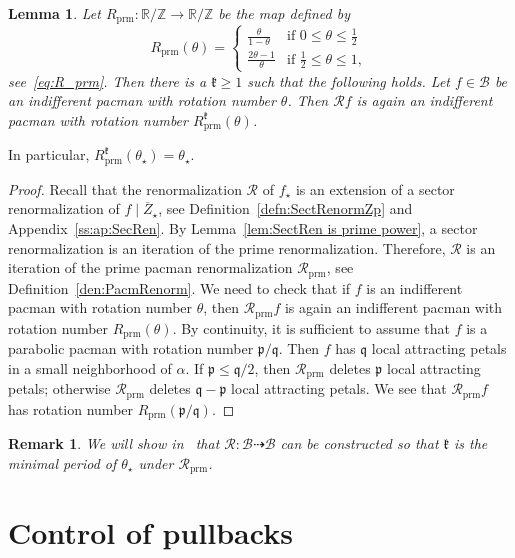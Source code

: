 \documentclass[]{amsart}
\newcommand\RR{\mathcal{R}}
\newcommand\prm{{\operatorname{prm}}}
\newcommand\RRc{\mathcal{R}_{\prm}}
\newcommand\cRRc{R_{\prm}}%
\newcommand{\str}{{\star}}
\newcommand{\pp}{\mathfrak{p}}
\renewcommand{\qq}{\mathfrak{q}}
\newcommand{\kk}{\mathfrak{k}}
\newcommand\BB{\mathcal{B}}
\newcommand{\R}{\mathbb{R}}
\newcommand{\Z}{\mathbb{Z}}
\newtheorem{lem}[thm]{Lemma}
\newtheorem{rem}[thm]{Remark}
\theoremstyle{remark}
\numberwithin{equation}{section}
\theoremstyle{definition}
\begin{document}
\begin{lem}
\label{lem:eq:S3:R_prm}
Let $\cRRc\colon \R/\Z\to \R/\Z$ be the map defined by
\begin{equation}
\label{eq:S3:R_prm}
 \cRRc (\theta)  = \begin{cases} \frac{\theta}{1-\theta}& \mbox{if }0\le \theta \le \frac{1}{2} \\
\frac{2\theta-1}{\theta} & \mbox{if }\frac{1}{2}\le \theta\le 1, \end{cases}
\end{equation} see~\eqref{eq:R_prm}. Then there is a $\kk\ge 1$ such that the following holds. Let $f\in \BB$ be an indifferent pacman with rotation number $\theta$. Then $\RR f$ is again an indifferent pacman with rotation number $\cRRc^\kk (\theta)$. 
\end{lem}
\noindent In particular, $\cRRc^\kk (\theta_\str)=\theta_\str$.
\begin{proof}
Recall that the renormalization $\RR$ of $ f_\str$ is an extension of a sector renormalization of $f\mid \overline Z_\str$, see Definition~\ref{defn:SectRenormZp} and Appendix~\ref{ss:ap:SecRen}. By Lemma~\ref{lem:SectRen is prime power}, a sector renormalization is an iteration of the prime renormalization. Therefore, $\RR$ is an iteration of the prime pacman renormalization $\RRc$, see Definition~\ref{den:PacmRenorm}. We need to check that if $f$ is an indifferent pacman with rotation number $\theta$, then $\RRc f$ is again an indifferent pacman with rotation number $\cRRc (\theta)$. By continuity, it is sufficient to assume that $f$ is a parabolic pacman with rotation number $\pp/\qq$. Then $f$ has $\qq$ local attracting petals in a small neighborhood of $\alpha$. If $\pp\le \qq/2$, then $\RRc$ deletes $\pp$ local attracting petals; otherwise $\RRc$ deletes $\qq-\pp$ local attracting petals. We see that $\RRc f$ has rotation number $\cRRc(\pp/\qq)$.
\end{proof}


\begin{rem}
\label{lem:min ren per}
We will show in~\cite{DL} that $\RR:\BB \dashrightarrow\BB$ can be constructed so that $\kk$ is the minimal period of $\theta_\str$ under $\RRc$. 
\end{rem}



\section{Control of pullbacks}
\end{document}

